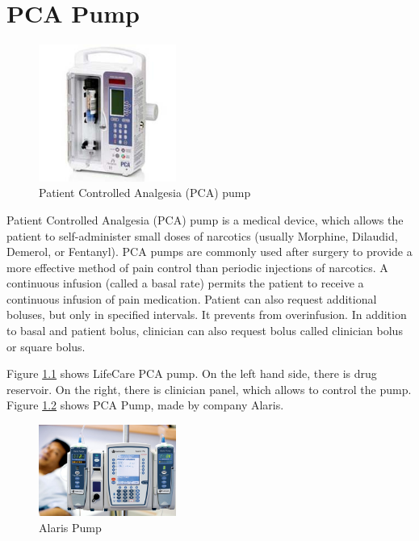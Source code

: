 
\cleardoublepage


\chapter{PCA Pump}
\label{pcapump}


\begin{figure}
  \begin{center}
    \includegraphics[width=0.4\textwidth]{figures/pca-pump.png}
  \end{center}
  \caption{Patient Controlled Analgesia (PCA) pump}
  \label{figure:pca-pump}
\end{figure}

Patient Controlled Analgesia (PCA) pump is a medical device, which allows the patient to self-administer small doses of narcotics (usually Morphine, Dilaudid, Demerol, or Fentanyl). PCA pumps are commonly used after surgery to provide a more effective method of pain control than periodic injections of narcotics. A continuous infusion (called a basal rate) permits the patient to receive a continuous infusion of pain medication. Patient can also request additional boluses, but only in specified intervals. It prevents from overinfusion. In addition to basal and patient bolus, clinician can also request bolus called clinician bolus or square bolus. 

Figure \ref{figure:pca-pump} shows LifeCare PCA pump. On the left hand side, there is drug reservoir. On the right, there is clinician panel, which allows to control the pump. Figure \ref{figure:alaris-pump} shows PCA Pump, made by company Alaris. 

\begin{figure}
  \begin{center}
    \includegraphics[width=0.4\textwidth]{figures/alaris-pump.png}
  \end{center}
  \caption{Alaris Pump}
  \label{figure:alaris-pump}
\end{figure}


